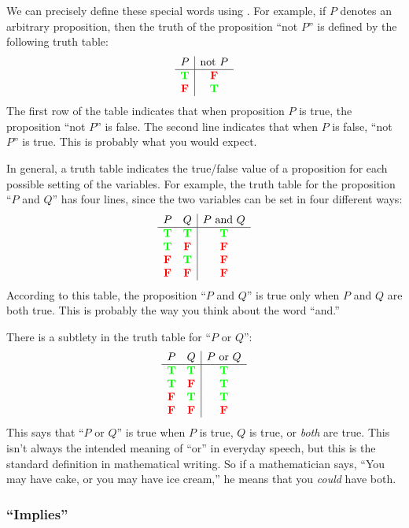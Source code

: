 We can precisely define these special words using .
For example, if $P$ denotes an arbitrary proposition, then the
truth of the proposition ``not $P$'' is defined by the following
truth table:
%
\[
\begin{array}{c|c}
P & \text{not $P$} \\ \hline
\textcolor{green}{\mathbf{T}} & \textcolor{red}{\mathbf{F}} \\
\textcolor{red}{\mathbf{F}} & \textcolor{green}{\mathbf{T}} \\
\end{array}
\]
%
The first row of the table indicates that when proposition $P$ is true,
the proposition ``not $P$'' is false.  The second line indicates that
when $P$ is false, ``not $P$'' is true.  This is probably what you would
expect.

In general, a truth table indicates the true/false value of a
proposition for each possible setting of the variables.  For example,
the truth table for the proposition ``$P$ and $Q$'' has four lines,
since the two variables can be set in four different ways:
%
\[
\begin{array}{cc|c}
P & Q & \text{$P$ and $Q$} \\ \hline
\textcolor{green}{\mathbf{T}} & \textcolor{green}{\mathbf{T}} & \textcolor{green}{\mathbf{T}} \\
\textcolor{green}{\mathbf{T}} & \textcolor{red}{\mathbf{F}} & \textcolor{red}{\mathbf{F}} \\
\textcolor{red}{\mathbf{F}} & \textcolor{green}{\mathbf{T}} & \textcolor{red}{\mathbf{F}} \\
\textcolor{red}{\mathbf{F}} & \textcolor{red}{\mathbf{F}} & \textcolor{red}{\mathbf{F}}
\end{array}
\]
%
According to this table, the proposition ``$P$ and $Q$'' is true only when
$P$ and $Q$ are both true.  This is probably the way you think about the
word ``and.''

There is a subtlety in the truth table for ``$P$ or $Q$'':
%
\[
\begin{array}{cc|c}
P & Q & \text{$P$ or $Q$} \\ \hline
\textcolor{green}{\mathbf{T}} & \textcolor{green}{\mathbf{T}} & \textcolor{green}{\mathbf{T}} \\
\textcolor{green}{\mathbf{T}} & \textcolor{red}{\mathbf{F}} & \textcolor{green}{\mathbf{T}} \\
\textcolor{red}{\mathbf{F}} & \textcolor{green}{\mathbf{T}} & \textcolor{green}{\mathbf{T}} \\
\textcolor{red}{\mathbf{F}} & \textcolor{red}{\mathbf{F}} & \textcolor{red}{\mathbf{F}}
\end{array}
\]
%
This says that ``$P$ or $Q$'' is true when $P$ is true, $Q$ is true, or
\textit{both} are true.  This isn't always the intended meaning of ``or''
in everyday speech, but this is the standard definition in mathematical
writing.  So if a mathematician says, ``You may have cake, or you may have
ice cream,'' he means that you \textit{could} have both.

\subsubsection{``Implies''}

